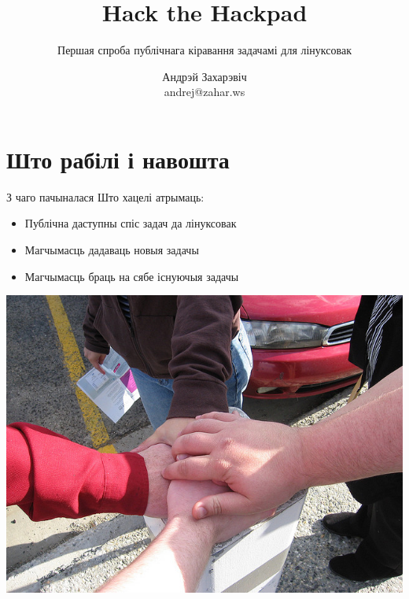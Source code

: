 \documentclass[ignorenonframetext,hyperref={pdftex,unicode}]{beamer}
\title{Hack the Hackpad} %
\subtitle{Першая спроба публічнага кіравання задачамі для лінуксовак} %
\author["Андрэй Захарэвіч"]{Андрэй Захарэвіч\\ andrej@zahar.ws} %
\begin{document}

\frame{\titlepage} %


\section{Што рабілі і навошта} %

\begin{frame}{З чаго пачыналася} %
	Што хацелі атрымаць:
	\begin{itemize}
		\item Публічна даступны спіс задач да лінуксовак\pause
		\item Магчымасць дадаваць новыя задачы\pause
		\item Магчымасць браць на сябе існуючыя задачы 
	\end{itemize}
	\begin{center}
 		\includegraphics[height=0.5\textheight,keepaspectratio]{145149313_c9c75df6f8_z} %
	\end{center}
\end{frame} %
\end{document}
